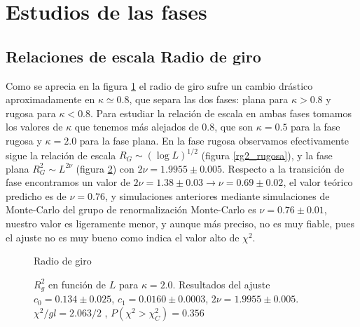 \section{Estudios de las fases}

\subsection{Relaciones de escala Radio de giro}

Como se aprecia en la figura \ref{radio-giro-fig} el radio de giro sufre un
cambio drástico aproximadamente en $\kappa\simeq 0.8$, que separa las dos
fases: plana para $\kappa> 0.8$ y rugosa  para $\kappa< 0.8$. Para estudiar la
relación de escala en ambas fases tomamos los valores de $\kappa$ que tenemos
más alejados de $0.8$, que son $\kappa=0.5$ para la fase rugosa y $\kappa=2.0$
para la fase plana. En la fase rugosa observamos efectivamente sigue la
relación de escala $R_G\sim (\log L)^{1/2}$ (figura \ref{rg2_rugosa}), y la
fase plana $R_G^2\sim L^{2\nu}$ (figura \ref{Rg2_plana}) con $2\nu=1.9955 \pm
0.005$. Respecto a la transición de fase encontramos un valor de $2\nu=1.38\pm
0.03\rightarrow \nu=0.69\pm 0.02$, el valor teórico predicho es de $\nu=0.76$,
y simulaciones anteriores mediante simulaciones de Monte-Carlo del grupo de
renormalización Monte-Carlo es $\nu=0.76\pm 0.01$,  nuestro valor es
ligeramente menor, y aunque más preciso, no es muy fiable, pues el ajuste no
 es muy bueno como indica el valor alto de $\chi^2$. 

\begin{figure}[h]
  \centering
  
  \caption{Radio de giro}\label{radio-giro-fig}
\end{figure}

\begin{figure}[h]
  \centering
  
  \caption{$R^2_g$ en función de $L$ para $\kappa=2.0$. Resultados del ajuste
    $c_0=0.134\pm 0.025$, $c_1=0.0160\pm 0.0003$, $2\nu=1.9955 \pm
    0.005$. $\chi^2/gl=2.063/2$ , $P(\chi^2>\chi_C^2)=0.356$}\label{Rg2_plana}







\end{figure}



